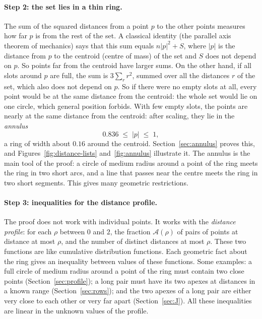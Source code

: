 \documentclass[11pt]{article}
\newcommand{\cA}{\mathcal{A}}
\theoremstyle{remark}
\begin{document}
\paragraph{Step 2: the set lies in a thin ring.} The sum of the squared
distances from a point $p$ to the other points measures how far $p$ is from
the rest of the set. A classical identity (the parallel axis theorem of
mechanics) says that this sum equals $n|p|^2 + S$, where $|p|$ is the
distance from $p$ to the centroid (centre of mass) of the set and $S$ does
not depend on $p$. So points far from the centroid have larger sums. On the
other hand, if all slots around $p$ are full, the sum is $3\sum_r r^2$,
summed over all the distances $r$ of the set, which also does not depend on
$p$. So if there were no empty slots at all, every point would be at the
same distance from the centroid: the whole set would lie on one circle,
which general position forbids. With few empty slots, the points are
nearly at the same distance from the centroid: after scaling, they lie in
the \emph{annulus}
\[
  0.836 \;\le\; |p| \;\le\; 1,
\]
a ring of width about $0.16$ around the centroid. Section~\ref{sec:annulus}
proves this, and Figures~\ref{fig:distance-lists} and~\ref{fig:annulus}
illustrate it. The annulus is the main tool of the proof: a circle of medium radius around a point of the ring meets the ring in two short arcs, and a line that passes near the centre meets the ring in two short segments. This gives many geometric
restrictions.

\paragraph{Step 3: inequalities for the distance profile.} The proof does
not work with individual points. It works with the \emph{distance profile}:
for each $\rho$ between $0$ and $2$, the fraction $\cA(\rho)$ of pairs of
points at distance at most $\rho$, and the number of distinct distances at
most $\rho$. These two functions are like cumulative distribution
functions. Each geometric fact about the ring gives an inequality between
values of these functions. Some examples: a full circle of medium radius
around a point of the ring must contain two close points
(Section~\ref{sec:profile}); a long pair must have its two apexes at
distances in a known range (Section~\ref{sec:rows}); and the two apexes of
a long pair are either very close to each other or very far apart
(Section~\ref{sec:J}). All these inequalities are linear in the unknown
values of the profile.
\end{document}
